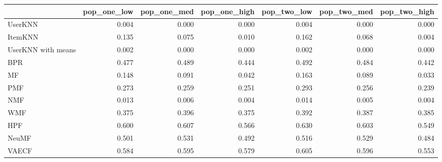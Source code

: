 \begin{tabular}{lrrrrrr}
\toprule
{} &  pop\_one\_low &  pop\_one\_med &  pop\_one\_high &  pop\_two\_low &  pop\_two\_med &  pop\_two\_high \\
\midrule
UserKNN            &        0.004 &        0.000 &         0.000 &        0.004 &        0.000 &         0.000 \\
ItemKNN            &        0.135 &        0.075 &         0.010 &        0.162 &        0.068 &         0.004 \\
UserKNN with means &        0.002 &        0.000 &         0.000 &        0.002 &        0.000 &         0.000 \\
BPR                &        0.477 &        0.489 &         0.444 &        0.492 &        0.484 &         0.442 \\
MF                 &        0.148 &        0.091 &         0.042 &        0.163 &        0.089 &         0.033 \\
PMF                &        0.273 &        0.259 &         0.251 &        0.293 &        0.256 &         0.239 \\
NMF                &        0.013 &        0.006 &         0.004 &        0.014 &        0.005 &         0.004 \\
WMF                &        0.375 &        0.396 &         0.375 &        0.392 &        0.387 &         0.385 \\
HPF                &        0.600 &        0.607 &         0.566 &        0.630 &        0.603 &         0.549 \\
NeuMF              &        0.501 &        0.531 &         0.492 &        0.516 &        0.529 &         0.484 \\
VAECF              &        0.584 &        0.595 &         0.579 &        0.605 &        0.596 &         0.553 \\
\bottomrule
\end{tabular}
